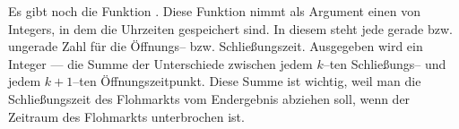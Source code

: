 Es gibt noch die Funktion . 
Diese Funktion nimmt als Argument einen  von Integers, in dem
die Uhrzeiten gespeichert sind.
In diesem  steht jede gerade bzw. ungerade Zahl für die Öffnungs-- bzw. Schließungszeit. 
Ausgegeben wird ein Integer --- die Summe der Unterschiede zwischen jedem $k$--ten Schließungs--
und jedem $k+1$--ten Öffnungszeitpunkt.
Diese Summe ist wichtig, weil man die Schließungszeit des Flohmarkts vom Endergebnis abziehen soll,
wenn der Zeitraum des Flohmarkts unterbrochen ist.